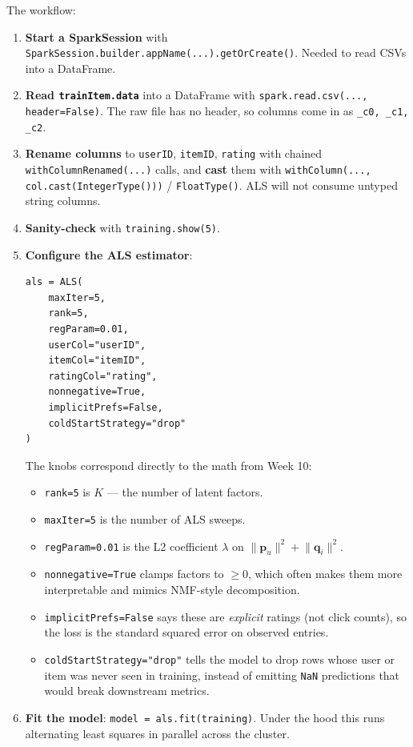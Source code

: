 \documentclass[11pt]{article}
\begin{document}
The workflow:
\begin{enumerate}
    \item \textbf{Start a SparkSession} with \texttt{SparkSession.builder.appName(...).getOrCreate()}. Needed to read CSVs into a DataFrame.
    \item \textbf{Read \texttt{trainItem.data}} into a DataFrame with \texttt{spark.read.csv(..., header=False)}. The raw file has no header, so columns come in as \texttt{\_c0, \_c1, \_c2}.
    \item \textbf{Rename columns} to \texttt{userID}, \texttt{itemID}, \texttt{rating} with chained \texttt{withColumnRenamed(...)} calls, and \textbf{cast} them with \texttt{withColumn(..., col.cast(IntegerType()))} / \texttt{FloatType()}. ALS will not consume untyped string columns.
    \item \textbf{Sanity-check} with \texttt{training.show(5)}.
    \item \textbf{Configure the ALS estimator}:
\begin{verbatim}
als = ALS(
    maxIter=5,
    rank=5,
    regParam=0.01,
    userCol="userID",
    itemCol="itemID",
    ratingCol="rating",
    nonnegative=True,
    implicitPrefs=False,
    coldStartStrategy="drop"
)
\end{verbatim}
    The knobs correspond directly to the math from Week 10:
    \begin{itemize}
        \item \texttt{rank=5} is $K$ --- the number of latent factors.
        \item \texttt{maxIter=5} is the number of ALS sweeps.
        \item \texttt{regParam=0.01} is the L2 coefficient $\lambda$ on $\lVert \mathbf{p}_u \rVert^{2} + \lVert \mathbf{q}_i \rVert^{2}$.
        \item \texttt{nonnegative=True} clamps factors to $\geq 0$, which often makes them more interpretable and mimics NMF-style decomposition.
        \item \texttt{implicitPrefs=False} says these are \emph{explicit} ratings (not click counts), so the loss is the standard squared error on observed entries.
        \item \texttt{coldStartStrategy="drop"} tells the model to drop rows whose user or item was never seen in training, instead of emitting \texttt{NaN} predictions that would break downstream metrics.
    \end{itemize}
    \item \textbf{Fit the model}: \texttt{model = als.fit(training)}. Under the hood this runs alternating least squares in parallel across the cluster.

\end{enumerate}
\end{document}
